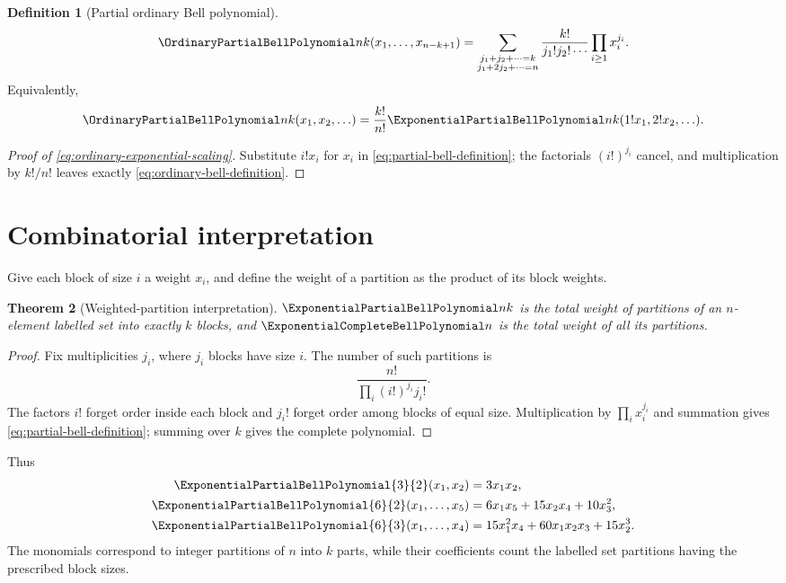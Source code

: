 \documentclass[11pt,a4paper,oneside,openany]{book}
\newtheorem{theorem}{Theorem}[chapter]
\theoremstyle{definition}
\newtheorem{definition}[theorem]{Definition}
\theoremstyle{remark}
\begin{document}
\begin{definition}[Partial ordinary Bell polynomial]
\begin{equation}\label{eq:ordinary-bell-definition}
 \OrdinaryPartialBellPolynomial nk(x_1,\ldots,x_{n-k+1})
 =\sum_{\substack{j_1+j_2+\cdots=k\\
                       j_1+2j_2+\cdots=n}}
 \frac{k!}{j_1!j_2!\cdots}\prod_{i\ge1}x_i^{j_i}.
\end{equation}
Equivalently,
\begin{equation}\label{eq:ordinary-exponential-scaling}
 \OrdinaryPartialBellPolynomial nk(x_1,x_2,\ldots)
 =\frac{k!}{n!}\ExponentialPartialBellPolynomial nk(1!x_1,2!x_2,\ldots).
\end{equation}
\end{definition}
\begin{proof}[Proof of \eqref{eq:ordinary-exponential-scaling}]
Substitute $i!x_i$ for $x_i$ in \eqref{eq:partial-bell-definition}; the factorials
$(i!)^{j_i}$ cancel, and multiplication by $k!/n!$ leaves exactly
\eqref{eq:ordinary-bell-definition}.
\end{proof}

\section{Combinatorial interpretation}
Give each block of size $i$ a weight $x_i$, and define the weight of a partition as
the product of its block weights.

\begin{theorem}[Weighted-partition interpretation]\label{thm:bell-poly-partitions}
$\ExponentialPartialBellPolynomial nk$ is the total weight of partitions of an $n$-element labelled set into
exactly $k$ blocks, and $\ExponentialCompleteBellPolynomial n$ is the total weight of all its partitions.
\end{theorem}
\begin{proof}
Fix multiplicities $j_i$, where $j_i$ blocks have size $i$.  The number of such
partitions is
\[
 \frac{n!}{\prod_i(i!)^{j_i}j_i!}.
\]
The factors $i!$ forget order inside each block and $j_i!$ forget order among
blocks of equal size.  Multiplication by $\prod_i x_i^{j_i}$ and summation gives
\eqref{eq:partial-bell-definition}; summing over $k$ gives the complete polynomial.
\end{proof}

Thus
\begin{align*}
 \ExponentialPartialBellPolynomial{3}{2}(x_1,x_2)&=3x_1x_2,\\
 \ExponentialPartialBellPolynomial{6}{2}(x_1,\ldots,x_5)&=6x_1x_5+15x_2x_4+10x_3^2,\\
 \ExponentialPartialBellPolynomial{6}{3}(x_1,\ldots,x_4)&=15x_1^2x_4+60x_1x_2x_3+15x_2^3.
\end{align*}
The monomials correspond to integer partitions of $n$ into $k$ parts, while their
coefficients count the labelled set partitions having the prescribed block sizes.
\end{document}
